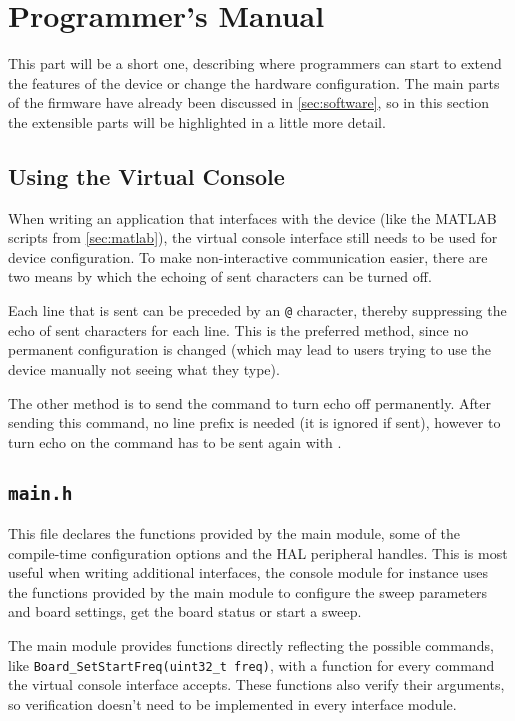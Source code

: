 \chapter{Programmer's Manual} \label{sec:api}

This part will be a short one, describing where programmers can start to extend the features of the device or
change the hardware configuration.
The main parts of the firmware have already been discussed in \autoref{sec:software}, so in this section
the extensible parts will be highlighted in a little more detail.


\section{Using the Virtual Console}

When writing an application that interfaces with the device (like the MATLAB scripts from \autoref{sec:matlab}),
the virtual console interface still needs to be used for device configuration.
To make non-interactive communication easier, there are two means by which the echoing of sent characters can be turned
off.

Each line that is sent can be preceded by an \texttt{@} character, thereby suppressing the echo of sent characters
for each line. This is the preferred method, since no permanent configuration is changed (which may lead to users
trying to use the device manually not seeing what they type).

The other method is to send the command  to turn echo off permanently. After sending
this command, no line prefix is needed (it is ignored if sent), however to turn echo on the command has to be sent
again with .


\section{\texttt{main.h}}

This file declares the functions provided by the main module, some of the compile-time configuration options and the
HAL peripheral handles. This is most useful when writing additional interfaces, the console module for instance uses
the functions provided by the main module to configure the sweep parameters and board settings, get the board status
or start a sweep.

The main module provides functions directly reflecting the possible commands, like
\verb!Board_SetStartFreq(uint32_t freq)!, with a function for every command the virtual console interface accepts.
These functions also verify their arguments, so verification doesn't need to be implemented in every interface module.

